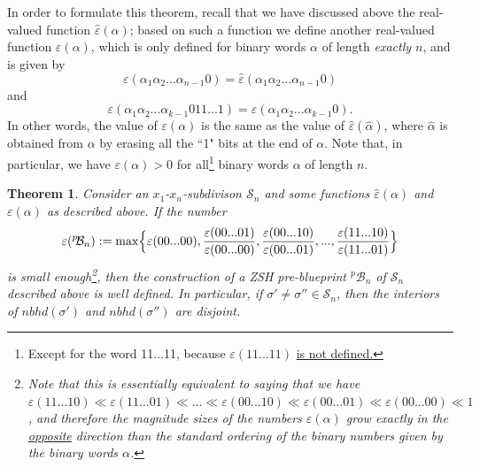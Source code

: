 \documentclass[12pt,letterpaper]{article}
\newtheorem{thm}{Theorem}[section]
\newtheorem{defn}[thm]{Definition}
\renewcommand{\S}{\mathcal{S}}
\newcommand{\B}{\mathcal{B}}
\newcommand{\eps}{\varepsilon}
\newcommand{\nbhd}{\mathit{nbhd}}
\renewcommand{\a}{\alpha}
\begin{document}
In order to formulate this theorem, recall that we have discussed above the real-valued function $\hat\eps(\a)$; based on such a function we define another real-valued function $\eps(\a)$, which is only defined for binary words $\a$ of length {\em exactly $n$}, and is given by 
$$
\eps(\a_1\a_2...\a_{n-1}0) = \hat\eps(\a_1\a_2...\a_{n-1}0)
$$
and 
$$
\eps(\a_1\a_2...\a_{k-1}011...1) = \hat\eps(\a_1\a_2...\a_{k-1}0).
$$
In other words, the value of $\eps(\a)$ is the same as the value of $\hat\eps(\hat\a)$, where $\hat\a$ is obtained from $\a$ by erasing all the ``1" bits at the end of $\a$. Note that, in particular, we have $\eps(\a) > 0$ for all\footnote{Except for the word 11...11, because $\eps(11...11)$ \ul{is not defined.}} binary words $\a$ of length  $n$.


\begin{thm}
\label{thm:ZSH_preblueprints_exist}
Consider an $x_1$-$x_n$-subdivison $\S_n$ and some functions $\hat\eps(\a)$ and $\eps(\a)$ as described above. If the number 
\begin{equation}
\label{max_eps}
\eps(^p\!\B_n) := \max \Bigl\{  \eps(00...00), \frac{\eps(00...01)}{\eps(00...00)}, \frac{\eps(00...10)}{\eps(00...01)}, ... ,  \frac{\eps(11...10)}{\eps(11...01)} \Bigr\}
\end{equation}
is small enough\footnote{Note that this is essentially equivalent to saying that we have $ \eps(11...10) \ll \eps(11...01) \ll ... \ll \eps(00...10) \ll \eps(00...01) \ll \eps(00...00) \ll 1 $, and therefore the magnitude sizes of the numbers $\eps(\a)$ grow exactly in the \ul{opposite} direction than the standard ordering of the binary numbers given by the binary words $\a$.}, then the construction of a ZSH pre-blueprint $^p\!\B_n$ of $\S_n$ described above is well defined. In particular, if $\sigma' \neq \sigma'' \in \S_n$, then the interiors of $\nbhd(\sigma')$ and $\nbhd(\sigma'')$ are disjoint. 
\end{thm}


\end{document}
